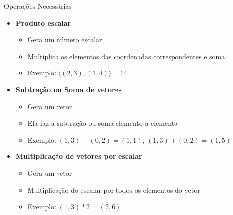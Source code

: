 \documentclass{beamer}
\begin{document}
\begin{frame}{Operações Necessárias}


\vspace{0.5cm}

\begin{itemize}

\item \textbf{Produto escalar}
\begin{itemize}
    \item Gera um número escalar 
    \item Multiplica os elementos das coordenadas correspondentes e soma
    \item Exemplo: $\langle (2,3),(1,4) \rangle = 14$
\end{itemize}

\vspace{0.4cm}

\item \textbf{Subtração ou Soma de vetores}
\begin{itemize}
    \item Gera um vetor
    \item Ela faz a subtração ou soma elemento a elemento
    \item Exemplo: $(1,3) - (0,2) = (1,1)$, $(1,3) + (0,2) = (1,5)$
\end{itemize}

\vspace{0.4cm}

\item \textbf{Multiplicação de vetores por escalar}
\begin{itemize}
    \item Gera um vetor
    \item Multiplicação do escalar por todos os elementos do vetor
    \item Exemplo: $(1,3) * 2 = (2,6)$
\end{itemize}

\end{itemize}

\end{frame}
\end{document}
